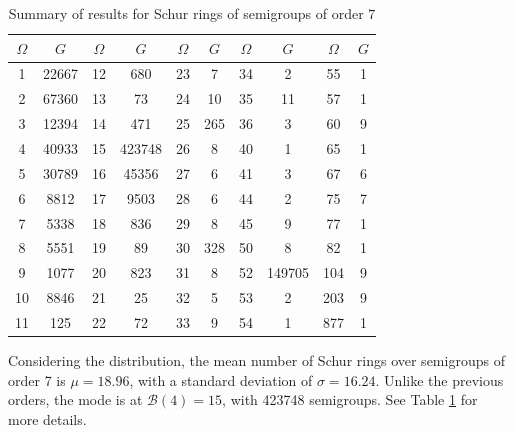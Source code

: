 \documentclass{article}
\theoremstyle{plain}
\theoremstyle{definition}
\newcommand{\B}{\mathscr{B}}
\begin{document}
\begin{table}[!ht]
\begin{center}
\begin{tabular}{cc|cc|cc|cc|cc}
$\Omega$    & $G$ & $\Omega$     & $G$ & $\Omega$  & $G$ & $\Omega$     & $G$ & $\Omega$ & $G$  \\
\hline
1  &22667 &  12 &680    &  23 &7   &  34 &2      &  55  & 1  \\
2  &67360 &  13 &73     &  24 &10  &  35 &11     &  57  & 1  \\
3  &12394 &  14 &471    & 25 & 265 &  36 &3      &  60  & 9  \\
4  &40933 &  15 &423748 &  26 &8   &  40 &1      &  65  & 1  \\
5  & 30789 & 16 &45356  &  27 &6   &  41 &3      &  67  & 6  \\
6  &8812  &  17 &9503   &  28 &6   &  44 &2      &  75  & 7  \\
7  &5338  &  18 &836    &  29 &8   &  45 &9      &  77  & 1  \\
8  &5551  &  19 &89     &  30 &328 &  50 &8      &  82  & 1  \\
9  &1077  &  20 &823    &  31 &8   &  52 &149705 &  104  & 9 \\
10 &8846  &  21 &25     &  32 &5   &  53 &2      &  203  & 9 \\
11 &125   &  22 &72     &  33 &9   & 54 & 1      &  877  & 1
\end{tabular}
\caption{Summary of results for Schur rings of semigroups of order $7$}
\label{fig:sr7}
\end{center}
\end{table}

Considering the distribution, the mean number of Schur rings over semigroups of order 7 is $\mu = 18.96$, %
with a standard deviation of $\sigma = 16.24$. %
Unlike the previous orders, the mode is at $\B(4) = 15$, with 423748 semigroups.  See Table \ref{fig:sr7} for more details.
\end{document}
